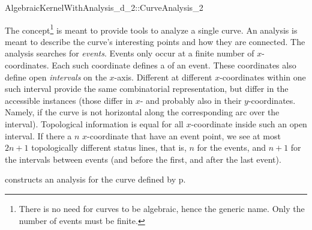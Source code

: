 \begin{ccRefConcept}{AlgebraicKernelWithAnalysis_d_2::CurveAnalysis_2}

\ccDefinition

The 
concept\footnote{There is no need
for curves to be algebraic, hence the generic name. Only the number
of events must be finite.}
 is meant to provide tools to analyze a single
curve. An analysis is meant to describe the curve's interesting points and how 
they are connected. The analysis searches for {\it events}. Events only
occur at a finite number of $x$-coordinates. Each such coordinate defines
a  of an event. These coordinates also define open 
{\it intervals} on the $x$-axis. Different 
 at different $x$-coordinates within one 
such interval provide the same combinatorial representation, but differ
in the accessible  instances (those differ in 
$x$- and probably also in their $y$-coordinates. Namely, if the curve is not
horizontal along the corresponding arc over the interval). 
Topological information is equal for all $x$-coordinate inside such an
open interval. If there a $n$ $x$-coordinate that have an event point, we 
see at most $2n+1$ topologically different status lines, that is, $n$ for 
the events, and $n+1$ for the intervals between events (and before the 
first, and after the last event).


\ccTypes \ccThree{}{+++++++++++++}{++++++++}






\ccCreation
{}
        
    {constructs an analysis for the curve defined by p. 
}


\end{ccRefConcept}
